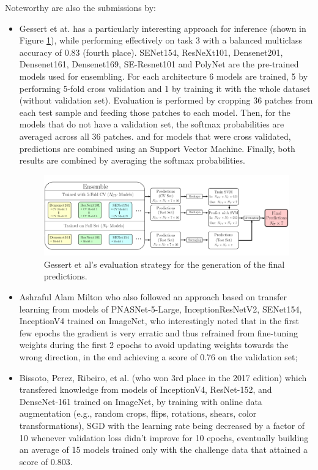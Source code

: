     Noteworthy are also the submissions by: 
    \begin{itemize}
        \item Gessert et at. \cite{gessert2018} has a particularly interesting approach for inference (shown in Figure \ref{fig:gessert2018}), while performing effectively on task 3 with a balanced multiclass accuracy of 0.83 (fourth place). SENet154, ResNeXt101, Densenet201, Densenet161, Densenet169, SE-Resnet101 and PolyNet are the pre-trained models used for ensembling. For each architecture 6 models are trained, 5 by performing 5-fold cross validation and 1 by training it with the whole dataset (without validation set). Evaluation is performed by cropping 36 patches from each test sample and feeding those patches to each model. Then, for the models that do not have a validation set, the softmax probabilities are averaged across all 36 patches. and for models that were cross validated, predictions are combined using an Support Vector Machine. Finally, both results are combined by averaging the softmax probabilities.
        \begin{figure}[ht]
            \centering
            \includegraphics[width=\linewidth]{figs/gessert2018.png}
            \caption{Gessert et al's evaluation strategy for the generation of the final predictions. \cite{gessert2018}}
            \label{fig:gessert2018}
        \end{figure}
        \item Ashraful Alam Milton \cite{Milton2018} who also followed an approach based on transfer learning from models of PNASNet-5-Large, InceptionResNetV2, SENet154, InceptionV4 trained on ImageNet, who interestingly noted that in the first few epochs the gradient is very erratic and thus refrained from fine-tuning weights during the first 2 epochs to avoid updating weights towards the wrong direction, in the end achieving a score of 0.76 on the validation set;
        \item Bissoto, Perez, Ribeiro, et al. \cite{Bissoto2018} (who won 3rd place in the 2017 edition) which transfered knowledge from models of InceptionV4, ResNet-152, and DenseNet-161 trained on ImageNet, by training with online data augmentation (e.g., random crops, flips, rotations, shears, color transformations), SGD with the learning rate being decreased by a factor of 10 whenever validation loss didn’t improve for 10 epochs, eventually building an average of 15 models trained only with the challenge data that attained a score of 0.803.
    \end{itemize}
    

